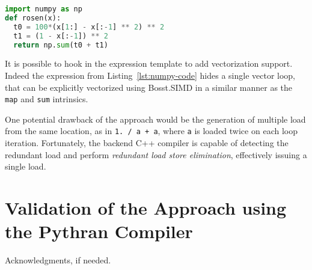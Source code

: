 \documentclass[preprint]{sigplanconf}
\begin{document}
\begin{lstlisting}[language=python, label={lst:numpy-code-fs}, caption={Sample \texttt{numpy} code requiring forward subsitution.}]
import numpy as np
def rosen(x):
  t0 = 100*(x[1:] - x[:-1] ** 2) ** 2
  t1 = (1 - x[:-1]) ** 2
  return np.sum(t0 + t1)
\end{lstlisting}

It is possible to hook in the expression template to add vectorization support.
Indeed the expression from Listing~\ref{lst:numpy-code} hides a single vector
loop, that can be explicitly vectorized using Bosst.SIMD in a similar manner as
the \texttt{map} and \texttt{sum} intrinsics.

One potential drawback of the approach would be the generation of multiple load
from the same location, as in \texttt{1. / a + a}, where \texttt{a} is loaded
twice on each loop iteration. Fortunately, the backend C++ compiler is capable
of detecting the redundant load and perform \emph{redundant load store
elimination}, effectively issuing a single load.

\section{Validation of the Approach using the Pythran Compiler}
\label{sec:benchs}

\acks

Acknowledgments, if needed.

\cite{*}



\end{document}
